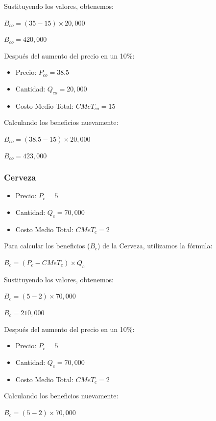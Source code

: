 \documentclass[
  letterpaper,
  DIV=11,
  numbers=noendperiod]{scrartcl}
\providecommand{\tightlist}{%
  \setlength{\itemsep}{0pt}\setlength{\parskip}{0pt}}\usepackage{longtable,booktabs,array}
\begin{document}
Sustituyendo los valores, obtenemos:

\(B_{co} = (35 - 15) \times 20,000\)

\(B_{co} = 420,000\)

Después del aumento del precio en un 10\%:

\begin{itemize}
\tightlist
\item
  Precio: \(P_{co} = 38.5\)
\item
  Cantidad: \(Q_{co} = 20,000\)
\item
  Costo Medio Total: \(CMeT_{co} = 15\)
\end{itemize}

Calculando los beneficios nuevamente:

\(B_{co} = (38.5 - 15) \times 20,000\)

\(B_{co} = 423,000\)

\hypertarget{cerveza}{%
\subsubsection{Cerveza}\label{cerveza}}

\begin{itemize}
\tightlist
\item
  Precio: \(P_c = 5\)
\item
  Cantidad: \(Q_c = 70,000\)
\item
  Costo Medio Total: \(CMeT_c = 2\)
\end{itemize}

Para calcular los beneficios (\(B_c\)) de la Cerveza, utilizamos la
fórmula:

\(B_c = (P_c - CMeT_c) \times Q_c\)

Sustituyendo los valores, obtenemos:

\(B_c = (5 - 2) \times 70,000\)

\(B_c = 210,000\)

Después del aumento del precio en un 10\%:

\begin{itemize}
\tightlist
\item
  Precio: \(P_c = 5\)
\item
  Cantidad: \(Q_c = 70,000\)
\item
  Costo Medio Total: \(CMeT_c = 2\)
\end{itemize}

Calculando los beneficios nuevamente:

\(B_c = (5 - 2) \times 70,000\)
\end{document}
